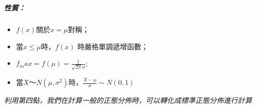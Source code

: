 \documentclass[11pt]{article}
\providecommand{\tightlist}{%
      \setlength{\itemsep}{0pt}\setlength{\parskip}{0pt}}
\begin{document}
    \begin{center}
    \end{center}
    { \hspace*{\fill} \\}
    
    \hypertarget{ux6027ux8cea}{%
\subparagraph{性質：}\label{ux6027ux8cea}}

\begin{itemize}
\tightlist
\item
  \(f(x)\)關於\(x = \mu\)對稱；
\item
  當\(x \leq \mu\)時，\(f(x)\) 時嚴格單調遞增函數；
\item
  \(f_max = f(\mu) = \frac{1}{\sqrt{2\pi}\sigma}\);
\item
  當\(X～N(\mu,\sigma^2)\)時，\(\frac{X - \mu}{\sigma} \sim N(0, 1)\) 
\end{itemize}

\emph{利用第四點，我們在計算一般的正態分佈時，可以轉化成標準正態分佈進行計算}
\end{document}
